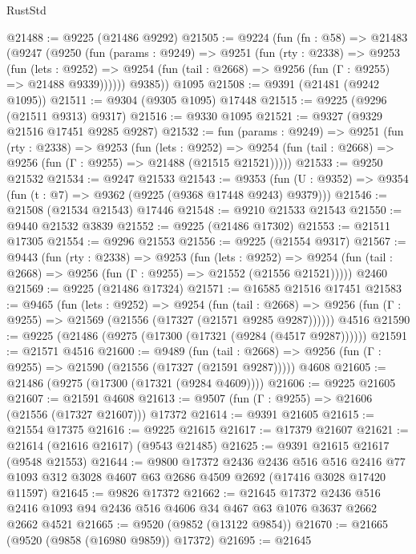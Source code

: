\begin{lexlean}{RustStd}
\begin{coremodule}
@21488 := @9225 (@21486 @9292)
@21505 := @9224
    (fun (fn : @58) =>
    @21483
      (@9247
        (@9250
          (fun (params : @9249) =>
          @9251
            (fun (rty : @2338) =>
            @9253
              (fun (lets : @9252) =>
              @9254 (fun (tail : @2668) => @9256 (fun (Γ : @9255) => @21488 @9339))))))
        @9385))
    @1095
@21508 := @9391 (@21481 (@9242 @1095))
@21511 := @9304 (@9305 @1095) @17448
@21515 := @9225 (@9296 (@21511 @9313) @9317)
@21516 := @9330 @1095
@21521 := @9327 (@9329 @21516 @17451 @9285 @9287)
@21532 := fun (params : @9249) =>
  @9251
    (fun (rty : @2338) =>
    @9253
      (fun (lets : @9252) =>
      @9254 (fun (tail : @2668) => @9256 (fun (Γ : @9255) => @21488 (@21515 @21521)))))
@21533 := @9250 @21532
@21534 := @9247 @21533
@21543 := @9353
    (fun (U : @9352) => @9354 (fun (t : @7) => @9362 (@9225 (@9368 @17448 @9243) @9379)))
@21546 := @21508 (@21534 @21543) @17446
@21548 := @9210 @21533 @21543
@21550 := @9440 @21532 @3839
@21552 := @9225 (@21486 @17302)
@21553 := @21511 @17305
@21554 := @9296 @21553
@21556 := @9225 (@21554 @9317)
@21567 := @9443
    (fun (rty : @2338) =>
    @9253
      (fun (lets : @9252) =>
      @9254 (fun (tail : @2668) => @9256 (fun (Γ : @9255) => @21552 (@21556 @21521)))))
    @2460
@21569 := @9225 (@21486 @17324)
@21571 := @16585 @21516 @17451
@21583 := @9465
    (fun (lets : @9252) =>
    @9254
      (fun (tail : @2668) =>
      @9256 (fun (Γ : @9255) => @21569 (@21556 (@17327 (@21571 @9285 @9287))))))
    @4516
@21590 := @9225 (@21486 (@9275 (@17300 (@17321 (@9284 (@4517 @9287))))))
@21591 := @21571 @4516
@21600 := @9489
    (fun (tail : @2668) => @9256 (fun (Γ : @9255) => @21590 (@21556 (@17327 (@21591 @9287)))))
    @4608
@21605 := @21486 (@9275 (@17300 (@17321 (@9284 @4609))))
@21606 := @9225 @21605
@21607 := @21591 @4608
@21613 := @9507 (fun (Γ : @9255) => @21606 (@21556 (@17327 @21607))) @17372
@21614 := @9391 @21605
@21615 := @21554 @17375
@21616 := @9225 @21615
@21617 := @17379 @21607
@21621 := @21614 (@21616 @21617) (@9543 @21485)
@21625 := @9391 @21615 @21617 (@9548 @21553)
@21644 := @9800
    @17372
    @2436
    @2436
    @516
    @516
    @2416
    @77
    @1093
    @312
    @3028
    @4607
    @63
    @2686
    @4509
    @2692
    (@17416 @3028 @17420 @11597)
@21645 := @9826 @17372
@21662 := @21645
    @17372
    @2436
    @516
    @2416
    @1093
    @94
    @2436
    @516
    @4606
    @34
    @467
    @63
    @1076
    @3637
    @2662
    @2662
    @4521
@21665 := @9520 (@9852 (@13122 @9854))
@21670 := @21665 (@9520 (@9858 (@16980 @9859)) @17372)
@21695 := @21645

\end{coremodule}
\end{lexlean}
